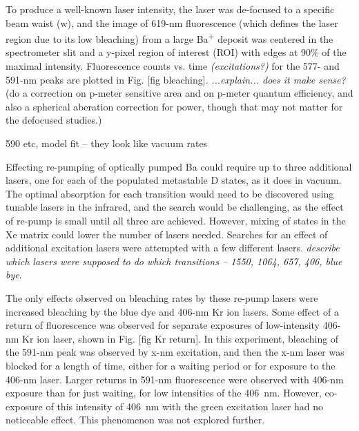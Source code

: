 To produce a well-known laser intensity, the laser was de-focused to a specific beam waist (w), and the image of 619-nm fluorescence (which defines the laser region due to its low bleaching) from a large Ba\textsuperscript{+} deposit was centered in the spectrometer slit and a y-pixel region of interest (ROI) with edges at 90\% of the maximal intensity.  Fluorescence counts vs. time \emph{\color{gray}(excitations?)} for the 577- and 591-nm peaks are plotted in Fig. [fig bleaching].  \emph{\color{gray}...explain... does it make sense?} ({\color{red}do a correction on p-meter sensitive area and on p-meter quantum efficiency, and also a spherical aberation correction for power, though that may not matter for the defocused studies.})

590 etc, model fit -- they look like vacuum rates


Effecting re-pumping of optically pumped Ba could require up to three additional lasers, one for each of the populated metastable D states, as it does in vacuum.  The optimal absorption for each transition would need to be discovered using tunable lasers in the infrared, and the search would be challenging, as the effect of re-pump is small until all three are achieved.  However, mixing of states in the Xe matrix could lower the number of lasers needed.  Searches for an effect of additional excitation lasers were attempted with a few different lasers.  \emph{\color{red}describe which lasers were supposed to do which transitions -- 1550, 1064, 657, 406, blue bye}.

The only effects observed on bleaching rates by these re-pump lasers were increased bleaching by the blue dye and 406-nm Kr ion lasers.  Some effect of a return of fluorescence was observed for separate exposures of low-intensity 406-nm Kr ion laser, shown in Fig. [fig Kr return].  In this experiment, bleaching of the 591-nm peak was observed by x-nm excitation, and then the x-nm laser was blocked for a length of time, either for a waiting period or for exposure to the 406-nm laser.  Larger returns in 591-nm fluorescence were observed with 406-nm exposure than for just waiting, for low intensities of the 406~nm.  However, co-exposure of this intensity of 406~nm with the green excitation laser had no noticeable effect.  This phenomenon was not explored further.

